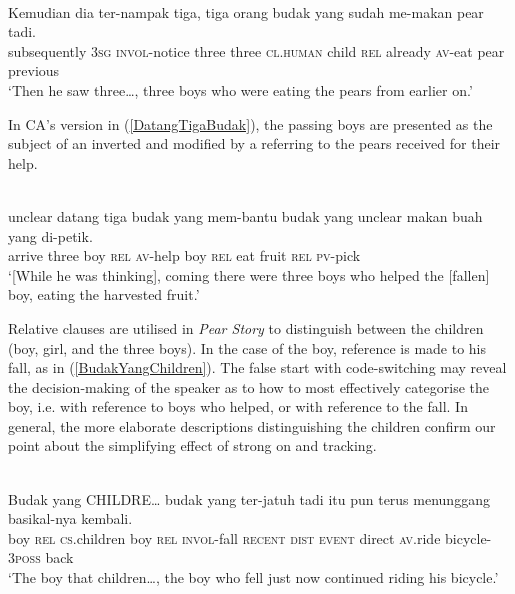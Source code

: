 \documentclass[output=paper
,modfonts
,nonflat]{langsci/langscibook}
\begin{document}
\ea\label{KemudianDiaTernampak} 
\\
\gll Kemudian     dia ter-nampak tiga,  {\ob}tiga  orang  budak yang sudah me-makan pear tadi{\cb}.\\
subsequently \textsc{3sg} \textsc{invol-}notice    three three \textsc{cl.human} child \textsc{rel}  already \textsc{av-}eat pear previous\\
\glt `Then he saw three\ldots, three boys who were eating the pears from earlier on.'
\z

\noindent
In CA's version in (\ref{DatangTigaBudak}), the passing boys are presented as the subject of an inverted  and modified by a  referring to the pears received for their help.

\ea\label{DatangTigaBudak} 
\\
\gll {\USSmaller}unclear{\USGreater} datang  {\ob}tiga  budak{\cb} yang mem-bantu budak yang {\USSmaller}unclear{\USGreater} makan buah yang di-petik.\\
{} arrive three boy   \textsc{rel}  \textsc{av-}help     boy   \textsc{rel} {}   eat   fruit \textsc{rel}  \textsc{pv-}pick\\
\glt `[While he was thinking], coming there were three boys who helped the [fallen] boy, eating the harvested fruit.'
\z

\noindent
Relative clauses are utilised in \emph{Pear Story} to distinguish between the children (boy, girl, and the three boys). In the case of the boy, reference is made to his fall, as  in (\ref{BudakYangChildren}). The false start with code-switching may reveal the decision-making of the speaker as to how to most effectively categorise the boy, i.e. with reference to boys who helped, or with reference to the fall. In general, the more elaborate descriptions distinguishing the children confirm our point about the simplifying effect of strong  on   and tracking.

\ea\label{BudakYangChildren} 
\\
\gll Budak yang {CHILDRE\ldots}  {\ob}budak yang ter-jatuh    tadi     itu pun{\cb}  terus menunggang basikal-nya     kembali.\\
boy   \textsc{rel}  \textsc{cs.}children       boy   \textsc{rel}  \textsc{invol-}fall  \textsc{recent} \textsc{dist} \textsc{event} direct \textsc{av.}ride       bicycle-\textsc{3poss} back\\
\glt `The boy that children\ldots, the boy who fell just now continued riding his bicycle.'
\z
\end{document}
